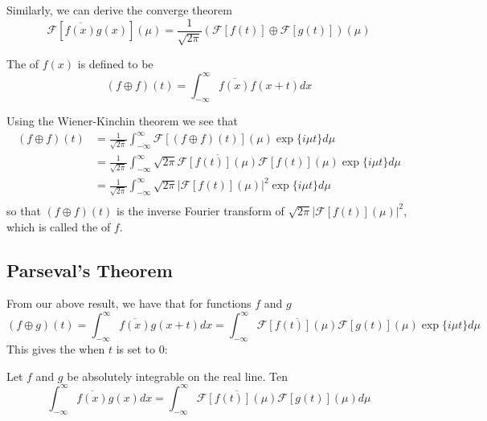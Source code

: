 \documentclass[12pt, a4paper, oneside, openright, titlepage]{book}
\begin{document}
Similarly, we can derive the converge theorem\begin{equation}
    \mathcal{F}[\overline{f(x)}g(x)](\mu) = \frac{1}{\sqrt{2\pi}}(\mathcal{F}[f(t)]\oplus \mathcal{F}[g(t)])(\mu)
\end{equation}

\begin{defn}
    The  of $f(x)$ is defined to be \begin{equation}
        (f\oplus f)(t) = \int_{-\infty}^{\infty}\overline{f(x)}f(x+t)dx
    \end{equation}
\end{defn}

Using the Wiener-Kinchin theorem we see that \begin{align*}
    (f\oplus f)(t) &= \frac{1}{\sqrt{2\pi}}\int_{-\infty}^{\infty}\mathcal{F}[(f\oplus f)(t)](\mu)\exp\{i\mu t\}d\mu \\
    &= \frac{1}{\sqrt{2\pi}}\int_{-\infty}^{\infty}\sqrt{2\pi}\overline{\mathcal{F}[f(t)](\mu)}\mathcal{F}[f(t)](\mu)\exp\{i\mu t\}d\mu \\
    &= \frac{1}{\sqrt{2\pi}}\int_{-\infty}^{\infty}\sqrt{2\pi}|\mathcal{F}[f(t)](\mu)|^2\exp\{i\mu t\}d\mu \\
\end{align*}
so that $(f\oplus f)(t)$ is the inverse Fourier transform of $\sqrt{2\pi}|\mathcal{F}[f(t)](\mu)|^2$, which is called the  of $f$.


\subsection{Parseval's Theorem}

From our above result, we have that for functions $f$ and $g$ \begin{equation*}
    (f\oplus g)(t) = \int_{-\infty}^{\infty}\overline{f(x)}g(x+t)dx = \int_{-\infty}^{\infty}\overline{\mathcal{F}[f(t)](\mu)}\mathcal{F}[g(t)](\mu)\exp\{i\mu t\}d\mu
\end{equation*}
This gives the  when $t$ is set to $0$: 

\begin{thm}
    Let $f$ and $g$ be absolutely integrable on the real line. Ten \begin{equation}
        \int_{-\infty}^{\infty}\overline{f(x)}g(x)dx = \int_{-\infty}^{\infty}\overline{\mathcal{F}[f(t)](\mu)}\mathcal{F}[g(t)](\mu)d\mu
    \end{equation}
\end{thm}
\end{document}
